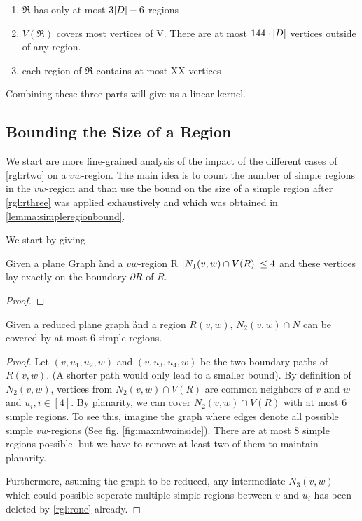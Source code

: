 \begin{enumerate}[topsep=0pt,itemsep=-1ex,partopsep=1ex,parsep=1ex]
    \item $\mathfrak{R}$ has only at most $3 \abs{D} - 6$ regions
    \item $V(\mathfrak{R})$ covers most vertices of V. There are at most $144 \cdot \abs{D}$ vertices outside of any region.
    \item each region of $\mathfrak{R}$ contains at most XX vertices
\end{enumerate}

Combining these three parts will give us a linear kernel.

\subsection{Bounding the Size of a Region}

We start are more fine-grained analysis of the impact of the different cases of \cref{rgl:rtwo} on a $vw$-region. The main idea is to count the number of simple regions in the $vw$-region and than use the bound on the size of a simple region after \cref{rgl:rthree} was applied exhaustively and which was obtained in \cref{lemma:simpleregionbound}.   

We start by giving 

\begin{lemma}\label{lemma:nonecover}
    Given a plane Graph \G and a $vw$-region R $\abs{N_1(v,w) \cap V(R)} \leq 4$ and these vertices lay exactly on the boundary $\partial R$ of $R$. 
\end{lemma}
\begin{proof}

\end{proof}

\begin{lemma}\cite[See Fact 5]{Garnero2018}\label{lemma:ntwocover}
    Given a reduced plane graph \G and a region $R(v,w)$, $N_2(v,w) \cap N$ can be covered by at most 6 simple regions.
\end{lemma}
\begin{proof}
    Let $(v,u_1, u_2,w)$ and $(v, u_3, u_4, w)$ be the two boundary paths of $R(v,w)$. (A shorter path would only lead to a smaller bound).
    By definition of $N_2(v,w)$, vertices from $N_2(v,w) \cap V(R)$ are common neighbors of $v$ and $w$ and $u_i, i \in [4]$. By planarity, we can cover $N_2(v,w) \cap V(R)$ with at most 6 simple regions. To see this, imagine the graph where edges denote all possible simple $vw$-regions (See fig. \ref{fig:maxntwoinside}). There are at most 8 simple regions possible. but we have to remove at least two of them to maintain planarity.

    Furthermore, asuming the graph to be reduced, any intermediate $N_3(v,w)$ which could possible seperate multiple simple regions between $v$ and $u_i$ has been deleted by \cref{rgl:rone} already.
\end{proof}

